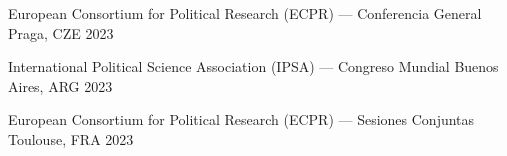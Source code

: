






\vspace{1mm}

\begin{cvhonors}
\cvconf
{European Consortium for Political Research (ECPR) --- Conferencia General} 
{Praga, CZE}
{2023}
\end{cvhonors}

\begin{cvhonors}
\cvconf
{International Political Science Association (IPSA) --- Congreso Mundial} 
{Buenos Aires, ARG}
{2023}
\end{cvhonors}



\begin{cvhonors}
\cvconf
{European Consortium for Political Research (ECPR) --- Sesiones Conjuntas} 
{Toulouse, FRA}
{2023}
\end{cvhonors}

